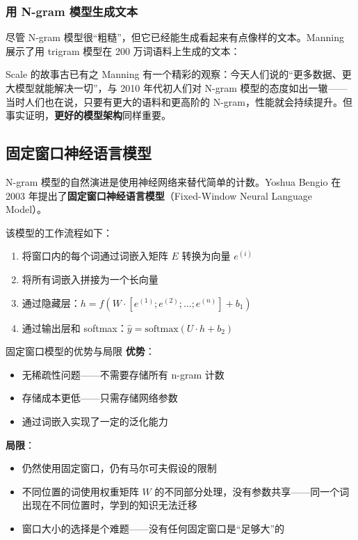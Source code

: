\documentclass[a4paper]{article}
\begin{document}



\subsubsection{用 N-gram 模型生成文本}

尽管 N-gram 模型很``粗糙''，但它已经能生成看起来有点像样的文本。Manning 展示了用 trigram 模型在 200 万词语料上生成的文本：





\begin{knowledgebox}{Scale 的故事古已有之}
Manning 有一个精彩的观察：今天人们说的``更多数据、更大模型就能解决一切''，与 2010 年代初人们对 N-gram 模型的态度如出一辙——当时人们也在说，只要有更大的语料和更高阶的 N-gram，性能就会持续提升。但事实证明，\textbf{更好的模型架构}同样重要。
\end{knowledgebox}

\subsection{固定窗口神经语言模型}

N-gram 模型的自然演进是使用神经网络来替代简单的计数。Yoshua Bengio 在 2003 年提出了\textbf{固定窗口神经语言模型}（Fixed-Window Neural Language Model）。





该模型的工作流程如下：

\begin{enumerate}
    \item 将窗口内的每个词通过词嵌入矩阵 $E$ 转换为向量 $e^{(i)}$
    \item 将所有词嵌入拼接为一个长向量
    \item 通过隐藏层：$h = f(W \cdot [e^{(1)}; e^{(2)}; \ldots; e^{(n)}] + b_1)$
    \item 通过输出层和 softmax：$\hat{y} = \text{softmax}(U \cdot h + b_2)$
\end{enumerate}

\begin{importantbox}{固定窗口模型的优势与局限}
\textbf{优势}：
\begin{itemize}
    \item 无稀疏性问题——不需要存储所有 n-gram 计数
    \item 存储成本更低——只需存储网络参数
    \item 通过词嵌入实现了一定的泛化能力
\end{itemize}
\textbf{局限}：
\begin{itemize}
    \item 仍然使用固定窗口，仍有马尔可夫假设的限制
    \item 不同位置的词使用权重矩阵 $W$ 的不同部分处理，没有参数共享——同一个词出现在不同位置时，学到的知识无法迁移
    \item 窗口大小的选择是个难题——没有任何固定窗口是``足够大''的
\end{itemize}
\end{importantbox}
\end{document}
